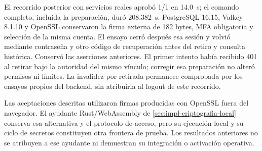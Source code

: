 El recorrido posterior con servicios reales aprobó 1/1 en 14.0~s; el comando
completo, incluida la preparación, duró 208.382~s. PostgreSQL 16.15,
Valkey 8.1.10 y OpenSSL conservaron la firma externa de 182 bytes, MFA obligatoria
y selección de la misma cuenta. El ensayo cerró después esa sesión y volvió
mediante contraseña y otro código de recuperación antes del retiro y consulta
histórica. Conservó las aserciones anteriores. El primer intento había recibido
401 al retirar bajo la autoridad del mismo vínculo; corregir esa preparación
no alteró permisos ni límites. La invalidez por retirada permanece comprobada
por los ensayos propios del backend, sin atribuirla al logout de este recorrido.

Las aceptaciones descritas utilizaron firmas producidas con OpenSSL fuera
del navegador. El ayudante Rust/WebAssembly de
\cref{sec:impl-criptografia-local} conserva esa alternativa y el protocolo
de acceso, pero su ejecuci\'on local y su ciclo de secretos constituyen otra
frontera de prueba. Los resultados anteriores no se atribuyen a ese ayudante ni
demuestran su integraci\'on o activaci\'on operativa.
